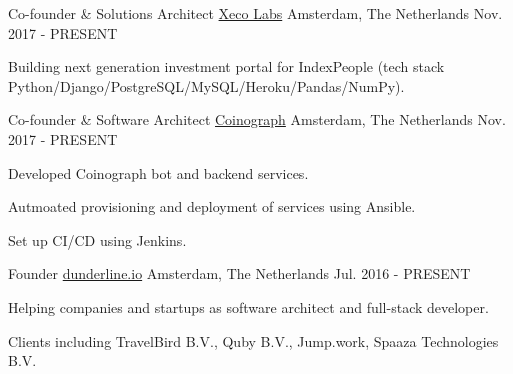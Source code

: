 

\begin{cventries}

  \cventry
    {Co-founder \& Solutions Architect} %
    {\href{https://www.xecolabs.com}{Xeco Labs}} %
    {Amsterdam, The Netherlands} %
    {Nov. 2017 - PRESENT} %
    {
    \begin{cvitems} %
      \item {Building next generation investment portal for IndexPeople (tech stack Python/Django/PostgreSQL/MySQL/Heroku/Pandas/NumPy).}
      \end{cvitems}
    }

  \cventry
    {Co-founder \& Software Architect} %
    {\href{https://www.coinograph.io}{Coinograph}} %
    {Amsterdam, The Netherlands} %
    {Nov. 2017 - PRESENT} %
    {
      \begin{cvitems} %
      \item {Developed Coinograph bot and backend services.}
      \item {Autmoated provisioning	and deployment of services using Ansible.}
      \item {Set up CI/CD using Jenkins.}
      \end{cvitems}
    }

  \cventry
    {Founder} %
    {\href{https://www.dunderline.io/}{dunderline.io}} %
    {Amsterdam, The Netherlands} %
    {Jul. 2016 - PRESENT} %
    {
      \begin{cvitems} %
        \item {Helping companies and startups as software architect and full-stack developer.}
        \item {Clients including TravelBird B.V., Quby B.V., Jump.work, Spaaza Technologies B.V.}
      \end{cvitems}
    }


\end{cventries}

